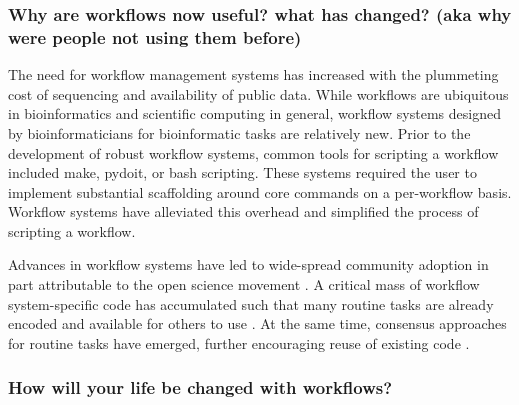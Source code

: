 \documentclass[10pt,letterpaper]{article}
\begin{document}
\subsubsection*{Why are workflows now useful? what has changed? (aka why were people not using them before)}
 
The need for workflow management systems has increased with the plummeting cost of sequencing and availability of public data.
While workflows are ubiquitous in bioinformatics and scientific computing in general, workflow systems designed by bioinformaticians for bioinformatic tasks are relatively new. 
Prior to the development of robust workflow systems, common tools for scripting a workflow included make, pydoit, or bash scripting. 
These systems required the user to implement substantial scaffolding around core commands on a per-workflow basis. 
Workflow systems have alleviated this overhead and simplified the process of scripting a workflow.

Advances in workflow systems have led to wide-spread community adoption in part attributable to the open science movement \cite{strozzi2019scalable}. 
A critical mass of workflow system-specific code has accumulated such that many routine tasks are already encoded and available for others to use \cite{ewels2020nf, cokelaer2017sequana}.
At the same time, consensus approaches for routine tasks have emerged, further encouraging reuse of existing code \cite{conesa2016survey, quince2017shotgun, luecken2019current, da2016next, knight2018best}.

\subsubsection*{How will your life be changed with workflows?}
\end{document}

